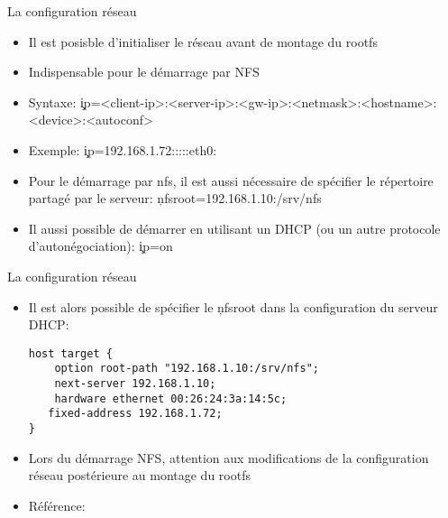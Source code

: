 \begin{frame}[fragile=singleslide]{La configuration réseau}
  \begin{itemize}
  \item Il est posisble d'initialiser le réseau avant de montage du rootfs
  \item Indispensable pour le démarrage par NFS
  \item Syntaxe: \c{ip=<client-ip>:<server-ip>:<gw-ip>:<netmask>:<hostname>:<device>:<autoconf>} 
  \item Exemple: \c{ip=192.168.1.72:::::eth0:}
  \item  Pour  le  démarrage  par  nfs, il  est  aussi  nécessaire  de
    spécifier    le    répertoire     partagé    par    le    serveur:
    \c{nfsroot=192.168.1.10:/srv/nfs}
  \item  Il aussi possible  de démarrer  en utilisant  un DHCP  (ou un
    autre protocole d'autonégociation): \c{ip=on}
  \end{itemize}
\end{frame} 

\begin{frame}[fragile=singleslide]{La configuration réseau}
  \begin{itemize} 
  \item  Il est  alors possible  de spécifier  le \c{nfsroot}  dans la
    configuration du serveur DHCP:
     \begin{lstlisting} 
host target {
    option root-path "192.168.1.10:/srv/nfs";
    next-server 192.168.1.10;
    hardware ethernet 00:26:24:3a:14:5c;
   fixed-address 192.168.1.72;
}
     \end{lstlisting} 
   \item  Lors du  démarrage NFS,  attention aux  modifications  de la
     configuration réseau postérieure au montage du rootfs
    \item Référence: 
  \end{itemize} 
\end{frame} 

